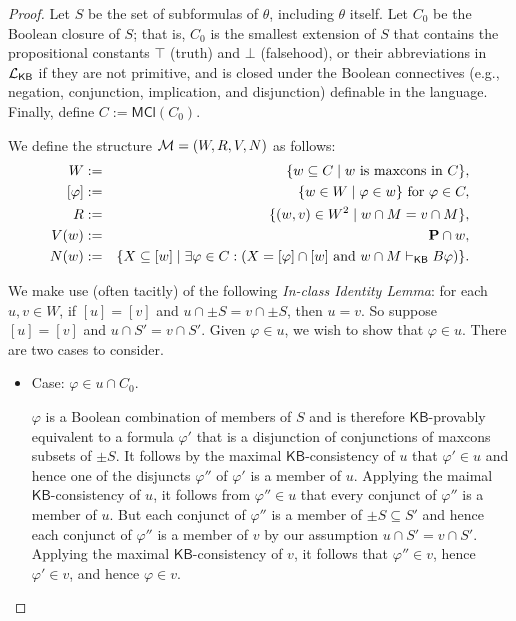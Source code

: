 \documentclass[12pt]{article}
\theoremstyle{definition}
\newcommand{\M}{{\cal M}}      %
\newcommand{\Prop}{{\bf P}}    %
\newcommand{\Lang}{{\cal L}}   %
\newcommand{\KB}{{\mathsf{KB}}}                 %
\newcommand{\MCl}{\mathsf{MCl}}                   %
\begin{document}
\begin{proof}
  Let $S$ be the set of subformulas of $\theta$, including $\theta$
  itself.  Let $C_0$ be the Boolean closure of $S$; that is, $C_0$ is
  the smallest extension of $S$ that contains the propositional
  constants $\top$ (truth) and $\bot$ (falsehood), or their
  abbreviations in $\Lang_\KB$ if they are not primitive, and is
  closed under the Boolean connectives (e.g., negation, conjunction,
  implication, and disjunction) definable in the language.  Finally,
  define $C:=\MCl(C_0)$.

  We define the structure $\M=(W,R,V,N)$ as follows:
  \begin{eqnarray*}
    W &:=& 
    \{w\subseteq C \mid w \text{ is maxcons in $C$}\}, 
    \\{}
    [\varphi] &:=& \{w\in W\mid \varphi\in w\}
    \text{ for } \varphi\in C,
    \\
    R &:=& \{(w,v)\in W^2\mid w\cap M=v\cap M\},
    \\{}
    V(w) &:=& \Prop\cap w,
    \\
    N(w) &:=&
    \{ X\subseteq[w] \mid 
    \exists\varphi\in C:(X=[\varphi]\cap[w]
    \text{ and }
    w\cap M\vdash_\KB B\varphi)
    \}.
  \end{eqnarray*}

  We make use (often tacitly) of the following \emph{In-class Identity
    Lemma\/}: for each $u,v\in W$, if $[u]=[v]$ and
  $u\cap\pm S=v\cap\pm S$, then $u=v$.  So suppose $[u]=[v]$ and
  $u\cap S'=v\cap S'$.  Given $\varphi\in u$, we wish to show that
  $\varphi\in u$.  There are two cases to consider.
  \begin{itemize}
  \item Case: $\varphi\in u\cap C_0$.

    $\varphi$ is a Boolean combination of members of $S$ and is
    therefore $\KB$-provably equivalent to a formula $\varphi'$ that
    is a disjunction of conjunctions of maxcons subsets of $\pm S$.
    It follows by the maximal $\KB$-consistency of $u$ that
    $\varphi'\in u$ and hence one of the disjuncts $\varphi''$ of
    $\varphi'$ is a member of $u$.  Applying the maimal
    $\KB$-consistency of $u$, it follows from $\varphi''\in u$ that
    every conjunct of $\varphi''$ is a member of $u$.  But each
    conjunct of $\varphi''$ is a member of $\pm S\subseteq S'$ and
    hence each conjunct of $\varphi''$ is a member of $v$ by our
    assumption $u\cap S'=v\cap S'$.  Applying the maximal
    $\KB$-consistency of $v$, it follows that $\varphi''\in v$, hence
    $\varphi'\in v$, and hence $\varphi\in v$.


\end{itemize}
\end{proof}
\end{document}
